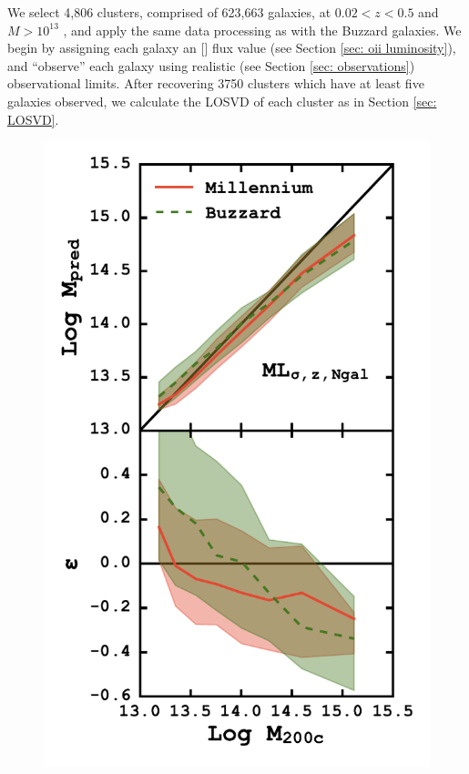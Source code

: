 We select 4,806 clusters, comprised of 623,663 galaxies, at $0.02 < z < 0.5$ and $M > 10^{13}$ \Msol, and apply the same data processing as with the Buzzard galaxies. We begin by assigning each galaxy an \hbox{[]} flux value (see Section \ref{sec: oii luminosity}), and ``observe'' each galaxy using realistic (see Section \ref{sec: observations}) observational limits. After recovering 3750 clusters which have at least five galaxies observed, we calculate the LOSVD of each cluster as in Section \ref{sec: LOSVD}. 

\begin{figure}
	\begin{center}
		\includegraphics[height=0.75\textheight]{figures1/millBuzzComparison.pdf} 

\end{center}
\end{figure}
